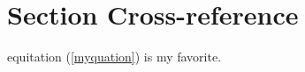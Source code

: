\documentclass{article}
\begin{document}

  \section{Section Cross-reference}
  equitation (\ref{myquation}) is my favorite.


%    
%
\end{document}

